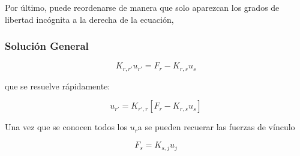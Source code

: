  Por último, puede reordenarse de manera que solo
aparezcan los grados de libertad incógnita a la derecha de la ecuación,

\begin{frame}[label=FrameSolveGeneral]
  \frametitle<presentation>{Solución General}

  \begin{equation}\label{EqReordenoGeneral}
    K_{r,r'} u_{r'} = F_r - K_{r,s} u_s
  \end{equation}

  que se resuelve rápidamente:

  \begin{equation}
    u_{r'} = K_{r',r} \left[ F_r - K_{r,s} u_s \right]
  \end{equation}

  Una vez que se conocen todos los $u_r$a se pueden recuerar las fuerzas de vínculo

  \begin{equation}
    F_s = K_{s,j} u_j
  \end{equation}

\end{frame}



